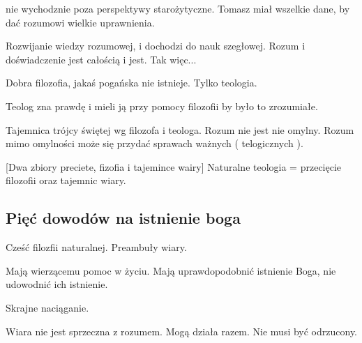 \documentclass[11pt]{article}
\begin{document}
nie wychodznie poza perspektywy starożytyczne. Tomasz miał wszelkie dane, by dać rozumowi wielkie uprawnienia.

Rozwijanie wiedzy rozumowej, i dochodzi do nauk szegłowej. Rozum i doświadczenie jest całością i jest. Tak więc...

Dobra filozofia, jakaś pogańska nie istnieje. Tylko teologia.

Teolog zna prawdę i mieli ją przy pomocy filozofii by było to zrozumiałe.

Tajemnica trójcy świętej wg filozofa i teologa.
Rozum nie jest nie omylny. Rozum mimo omylności może się przydać sprawach ważnych ( telogicznych ).

[Dwa zbiory preciete, fizofia i tajemince wairy]
Naturalne teologia = przecięcie filozofii oraz tajemnic wiary.

\subsection{Pięć dowodów na istnienie boga}
Cześć filozfii naturalnej. Preambuły wiary.

Mają wierzącemu pomoc w życiu.
Mają uprawdopodobnić istnienie Boga, nie udowodnić ich istnienie.

Skrajne naciąganie.

Wiara nie jest sprzeczna z rozumem. Mogą działa razem. Nie musi być odrzucony.
\end{document}
